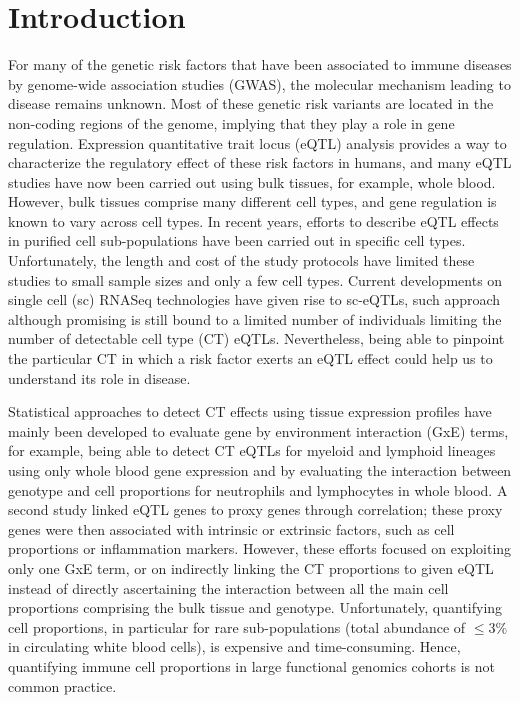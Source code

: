 \section{Introduction}

For many of the genetic risk factors that have been associated to immune diseases by genome-wide association studies (GWAS), the molecular mechanism leading to disease remains unknown\cite{hindorffPotentialEtiologicFunctional2009}. Most of these genetic risk variants are located in the non-coding regions of the genome, implying that they play a role in gene regulation\cite{ionita-lazaSpectralApproachIntegrating2016,javierreLineageSpecificGenomeArchitecture2016}. Expression quantitative trait locus (eQTL) analysis provides a way to characterize the regulatory effect of these risk factors in humans, and many eQTL studies have now been carried out using bulk tissues, for example, whole blood\cite{westraSystematicIdentificationTrans2013,joehanesIntegratedGenomewideAnalysis2017}. However, bulk tissues comprise many different cell types, and gene regulation is known to vary across cell types\cite{rajPolarizationEffectsAutoimmune2014,petersInsightGenotypePhenotypeAssociations2016,naranbhaiGenomicModulatorsGene2015}. In recent years, efforts to describe eQTL effects in purified cell sub-populations have been carried out in specific cell types\cite{chenGeneticDriversEpigenetic2016}. Unfortunately, the length and cost of the study protocols have limited these studies to small sample sizes and only a few cell types. Current developments on single cell (sc) RNASeq technologies have given rise to sc-eQTLs, such approach although promising is still bound to a limited number of individuals limiting the number of detectable cell type (CT) eQTLs. Nevertheless, being able to pinpoint the particular CT in which a risk factor exerts an eQTL effect could help us to understand its role in disease.

Statistical approaches to detect CT effects using tissue expression profiles have mainly been developed to evaluate gene by environment interaction (GxE) terms, for example, being able to detect CT eQTLs for myeloid and lymphoid lineages using only whole blood gene expression and by evaluating the interaction between genotype and cell proportions for neutrophils and lymphocytes in whole blood\cite{westraCellSpecificEQTL2015}. A second study linked eQTL genes to proxy genes through correlation; these proxy genes were then associated with intrinsic or extrinsic factors, such as cell proportions or inflammation markers\cite{zhernakovaIdentificationContextdependentExpression2017}. However, these efforts focused on exploiting only one GxE term, or on indirectly linking the CT proportions to given eQTL instead of directly ascertaining the interaction between all the main cell proportions comprising the bulk tissue and genotype. Unfortunately, quantifying cell proportions, in particular for rare sub-populations (total abundance of $\leq 3\%$ in circulating white blood cells), is expensive and time-consuming. Hence, quantifying immune cell proportions in large functional genomics cohorts is not common practice.

